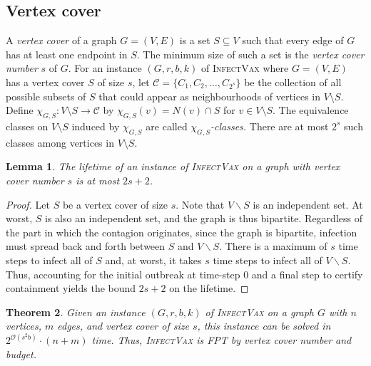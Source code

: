 \documentclass[unknownkeysallowed]{article}
\newtheorem{theorem}{Theorem}[section]
\newtheorem{lemma}[theorem]{Lemma}
\theoremstyle{definition}\newtheorem{strategy}{Strategy}
\theoremstyle{definition}\newtheorem{notation}{Notation}[theorem]
\newcommand*{\IV}{\textup{\textsc{InfectVax}}\xspace}
\newcommand*{\bigO}[1]{\mathcal{O}({#1})}
\begin{document}
\subsection{Vertex cover}
\label{sec:vertex-cover}

A \emph{vertex cover} of a graph $G=(V,E)$ is a set $S\subseteq V$ such that every edge of $G$ has at least one endpoint in $S$. The minimum size of such a set is the \emph{vertex cover number} $s$ of $G$.  For an instance $(G, r, b, k)$ of \IV where $G=(V,E)$ has a vertex cover $S$ of size $s$, let $\mathcal{C} = \{C_1, C_2, \ldots, C_{2^s}\}$ be the collection of all possible subsets of $S$ that could appear as neighbourhoods of vertices in $V\setminus S$. 
Define $\chi_{G,S}: V \setminus S \to \mathcal{C}$ by $\chi_{G,S}(v) = N(v) \cap S$ for $v \in V \setminus S$. The equivalence classes on $V\setminus S$ induced by $\chi_{G, S}$ are called \emph{$\chi_{G,S}$-classes.} There are at most $2^s$ such classes among vertices in $V\setminus S$. 


\begin{lemma}\label{lem:lifetime}
  The lifetime of an instance of \IV on a graph with vertex cover number $s$ is at most $2s+2$.
\end{lemma}

\begin{proof}
Let $S$ be a vertex cover of size $s$. Note that $V\backslash S$ is an independent set. At worst, $S$ is also an independent set, and the graph is thus bipartite. Regardless of the part in which the contagion originates, since the graph is bipartite, infection must spread back and forth between $S$ and $V\backslash S$. There is a maximum of $s$ time steps to infect all of $S$ and, at worst, it takes $s$ time steps to infect all of $V \backslash S$. Thus, accounting for the initial outbreak at time-step $0$ and a final step to certify containment yields the bound $2s+2$ on the lifetime.
\end{proof}

\begin{theorem}
  Given an instance $(G, r, b, k)$ of \IV on a graph $G$ with $n$ vertices, $m$ edges, and vertex cover of size $s$, this instance can be solved in $2^{\bigO{s^2 b}}\cdot (n+m)$ time. Thus, \IV is FPT by vertex cover number and budget.
\end{theorem}
\end{document}
